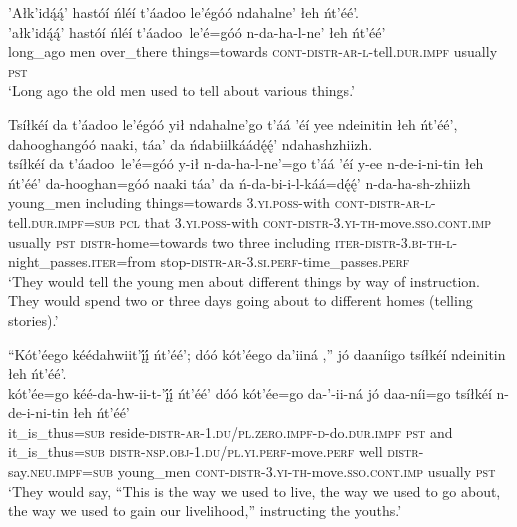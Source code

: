 \ea\label{ex:text2-1-1}
’Ałk’idą́ą́’ hastóí ńléí t’áadoo le’égóó ndahalne’ łeh ńt’éé’.\\
\gll ’ałk’idą́ą́’	hastóí	ńléí	t’áadoo~{le’é=góó}	n-da-ha-l-ne’	łeh	ńt’éé’\\
     long\_ago	men	over\_there	things=towards	\textsc{cont}-\textsc{distr}-\textsc{ar}-\textsc{l}-tell.\textsc{dur}.\textsc{impf}	usually	\textsc{pst}\\
\glt `Long ago the old men used to tell about various things.'
\z

\ea\label{ex:text2-1-2}
Tsíłkéí da t’áadoo le’égóó yił ndahalne’go t’áá ’éí yee ndeinitin łeh ńt’éé’, dahooghangóó naaki, táa’ da ńdabiilkáádę́ę́’ ndahashzhiizh.\\
\gll tsíłkéí	da	t’áadoo~{le’é=góó}	y-ił	n-da-ha-l-ne’=go	t’áá ’éí	y-ee	n-de-i-ni-tin	łeh	ńt’éé’	da-hooghan=góó	naaki	táa’	da	ń-da-bi-i-l-káá=dę́ę́’	n-da-ha-sh-zhiizh\\
     young\_men	including	things=towards	3.\textsc{yi}.\textsc{poss}-with	\textsc{cont}-\textsc{distr}-\textsc{ar}-\textsc{l}-tell.\textsc{dur}.\textsc{impf}=\textsc{sub}	\textsc{pcl} that	3.\textsc{yi}.\textsc{poss}-with	\textsc{cont}-\textsc{distr}-3.\textsc{yi}-\textsc{th}-move.\textsc{sso}.\textsc{cont}.\textsc{imp}	usually	\textsc{pst}	\textsc{distr}-home=towards	two	three	including	\textsc{iter}-\textsc{distr}-3.\textsc{bi}-\textsc{th}-\textsc{l}-night\_passes.\textsc{iter}=from	stop-\textsc{distr}-\textsc{ar}-3.\textsc{si}.\textsc{perf}-time\_passes.\textsc{perf}\\
\glt `They would tell the young men about different things by way of instruction. They would spend two or three days going about to different homes (telling stories).'
\z

\ea\label{ex:text2-1-3}
``Kót’éego kéédahwiit’į́į́ ńt’éé’; dóó kót’éego da’iiná ,'' jó daaníigo tsíłkéí ndeinitin łeh ńt’éé’.\\
\gll kót’ée=go	kéé-da-hw-ii-t-’į́į́	ńt’éé’	dóó	kót’ée=go	da-’-ii-ná	jó	daa-níi=go	tsíłkéí	n-de-i-ni-tin	łeh	ńt’éé’\\
     it\_is\_thus=\textsc{sub}	reside-\textsc{distr}-\textsc{ar}-1.\textsc{du}/\textsc{pl}.\textsc{zero}.\textsc{impf}-\textsc{d}-do.\textsc{dur}.\textsc{impf}	\textsc{pst}	and	it\_is\_thus=\textsc{sub}	\textsc{distr}-\textsc{nsp}.\textsc{obj}-1.\textsc{du}/\textsc{pl}.\textsc{yi}.\textsc{perf}-move.\textsc{perf}	well	\textsc{distr}-say.\textsc{neu}.\textsc{impf}=\textsc{sub}	young\_men	\textsc{cont}-\textsc{distr}-3.\textsc{yi}-\textsc{th}-move.\textsc{sso}.\textsc{cont}.\textsc{imp}	usually	\textsc{pst}\\
\glt `They would say, ``This is the way we used to live, the way we used to go about, the way we used to gain our livelihood,'' instructing the youths.'
\z


